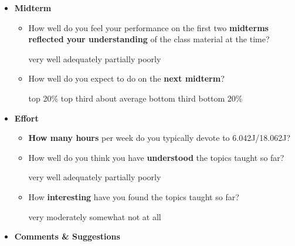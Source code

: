 \documentclass[handout]{mcs}
\begin{document}
\begin{itemize}
\begin{itemize}
\end{itemize}

\item \textbf{Midterm}

\begin{itemize}

\item How well do you feel your performance on the first two \textbf{midterms
  reflected your understanding} of the class material at the time?

\begin{center}
very well\hspace{0.3in} adequately\hspace{0.3in} partially\hspace{0.3in} poorly
\end{center}

\item How well do you expect to do on the \textbf{next midterm}?

\begin{center}
top 20\%\hspace{0.3in} top third \hspace{0.3in} about average\hspace{0.3in}  bottom third \hspace{0.3in} 
 bottom 20\%
\end{center}

\end{itemize}

\item \textbf{Effort}

\begin{itemize}
\item \textbf{How many hours} per week do you typically devote to 6.042J/18.062J?\brule{0.5in}

\item How well do you think you have \textbf{understood} the topics taught so
  far?

\begin{center}
very well\hspace{0.3in} adequately\hspace{0.3in} partially\hspace{0.3in} poorly
\end{center}

\item How \textbf{interesting} have you found the topics taught so far?

\begin{center}
very\hspace{0.3in} moderately\hspace{0.3in} somewhat \hspace{0.3in} not at all
\end{center}

\end{itemize}

\item \textbf{Comments \& Suggestions}

\end{itemize}
\end{document}
